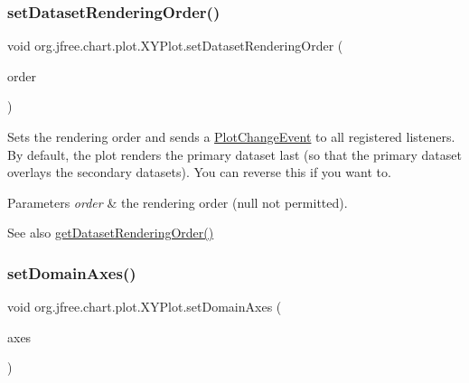\subsubsection{\texorpdfstring{set\+Dataset\+Rendering\+Order()}{setDatasetRenderingOrder()}}
{\footnotesize\ttfamily void org.\+jfree.\+chart.\+plot.\+X\+Y\+Plot.\+set\+Dataset\+Rendering\+Order (\begin{DoxyParamCaption}\item[{\mbox{\hyperlink{classorg_1_1jfree_1_1chart_1_1plot_1_1_dataset_rendering_order}{Dataset\+Rendering\+Order}}}]{order }\end{DoxyParamCaption})}

Sets the rendering order and sends a \mbox{\hyperlink{}{Plot\+Change\+Event}} to all registered listeners. By default, the plot renders the primary dataset last (so that the primary dataset overlays the secondary datasets). You can reverse this if you want to.


\begin{DoxyParams}{Parameters}
{\em order} & the rendering order ({\ttfamily null} not permitted).\\
\hline
\end{DoxyParams}
\begin{DoxySeeAlso}{See also}
\mbox{\hyperlink{classorg_1_1jfree_1_1chart_1_1plot_1_1_x_y_plot_a09cd7f85a32d373cbe5ceb73e90c86ed}{get\+Dataset\+Rendering\+Order()}} 
\end{DoxySeeAlso}
\mbox{\label{classorg_1_1jfree_1_1chart_1_1plot_1_1_x_y_plot_afdba09c2c39e5f02dad056aa4a09416a}} 
\subsubsection{\texorpdfstring{set\+Domain\+Axes()}{setDomainAxes()}}
{\footnotesize\ttfamily void org.\+jfree.\+chart.\+plot.\+X\+Y\+Plot.\+set\+Domain\+Axes (\begin{DoxyParamCaption}\item[{\mbox{\hyperlink{classorg_1_1jfree_1_1chart_1_1axis_1_1_value_axis}{Value\+Axis}} \mbox{[}$\,$\mbox{]}}]{axes }\end{DoxyParamCaption})}

